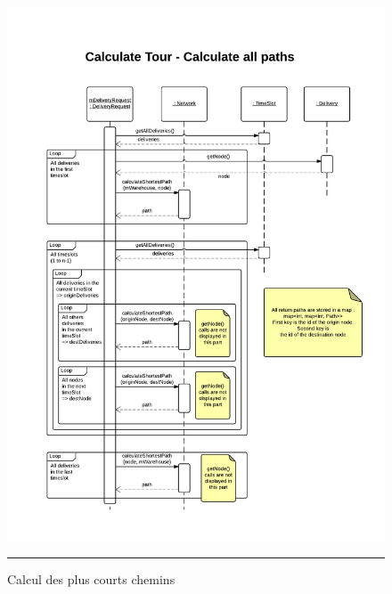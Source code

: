 \begin{figure}[H]
	\centering
		\includegraphics[width=\textwidth,height=\textheight,keepaspectratio]{Figures/calcul_tournee2}
		\rule{35em}{0.5pt}
	\caption[Calcul des plus courts chemins]{Calcul des plus courts chemins}
\end{figure}
\clearpage
